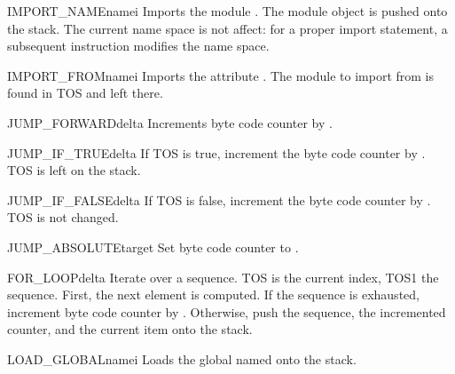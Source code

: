 \begin{opcodedesc}{IMPORT_NAME}{namei}
Imports the module .  The module object is
pushed onto the stack.  The current name space is not affect: for a
proper import statement, a subsequent  instruction
modifies the name space.
\end{opcodedesc}

\begin{opcodedesc}{IMPORT_FROM}{namei}
Imports the attribute .  The module to import
from is found in TOS and left there.
\end{opcodedesc}

\begin{opcodedesc}{JUMP_FORWARD}{delta}
Increments byte code counter by .
\end{opcodedesc}

\begin{opcodedesc}{JUMP_IF_TRUE}{delta}
If TOS is true, increment the byte code counter by .  TOS is
left on the stack.
\end{opcodedesc}

\begin{opcodedesc}{JUMP_IF_FALSE}{delta}
If TOS is false, increment the byte code counter by .  TOS
is not changed. 
\end{opcodedesc}

\begin{opcodedesc}{JUMP_ABSOLUTE}{target}
Set byte code counter to .
\end{opcodedesc}

\begin{opcodedesc}{FOR_LOOP}{delta}
Iterate over a sequence.  TOS is the current index, TOS1 the sequence.
First, the next element is computed.  If the sequence is exhausted,
increment byte code counter by .  Otherwise, push the
sequence, the incremented counter, and the current item onto the stack.
\end{opcodedesc}


\begin{opcodedesc}{LOAD_GLOBAL}{namei}
Loads the global named  onto the stack.
\end{opcodedesc}


